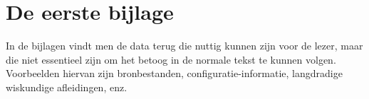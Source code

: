 \chapter{De eerste bijlage}
\label{app:A}
In de bijlagen vindt men de data terug die nuttig kunnen zijn voor de
lezer, maar die niet essentieel zijn om het betoog in de normale tekst te
kunnen volgen. Voorbeelden hiervan zijn bronbestanden,
configuratie-informatie, langdradige wiskundige afleidingen, enz.

